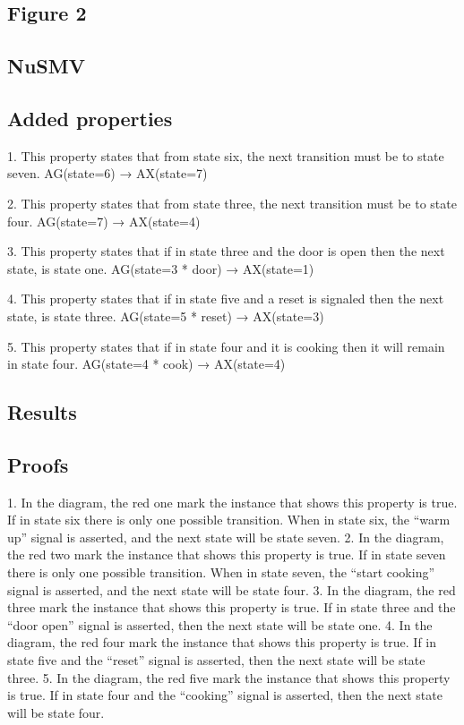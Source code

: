 \documentclass[11pt]{article}
\begin{document}
\subsection{Figure 2}
	\subsection{NuSMV}
	\subsection{Added properties}
	1. This property states that from state six, the next transition must be to state seven.
		AG(state=6) → AX(state=7)

	2. This property states that from state three, the next transition must be to state four.
		AG(state=7) → AX(state=4)

	3. This property states that if in state three and the door is open then the next state, is state one.
		AG(state=3 * door) → AX(state=1)

	4. This property states that if in state five and a reset is signaled then the next state, is state three.
		AG(state=5 * reset) → AX(state=3)

	5. This property states that if in state four and it is cooking then it will remain in state four.
		AG(state=4 * cook) → AX(state=4)
	
	\subsection{Results}
	\subsection{Proofs}
1. In the diagram, the red one mark the instance that shows this property is true. If in state six there is only one possible transition. When in state six, the “warm up” signal is asserted, and the next state will be state seven.
2. In the diagram, the red two mark the instance that shows this property is true. If in state seven there is only one possible transition. When in state seven, the “start cooking” signal is asserted, and the next state will be state four.
3. In the diagram, the red three mark the instance that shows this property is true. If in state three and the “door open” signal is asserted, then the next state will be state one.
4. In the diagram, the red four mark the instance that shows this property is true.  If in state five and the “reset” signal is asserted, then the next state will be state three.
5. In the diagram, the red five mark the instance that shows this property is true.  If in state four and the “cooking” signal is asserted, then the next state will be state four.
	
\end{document}
